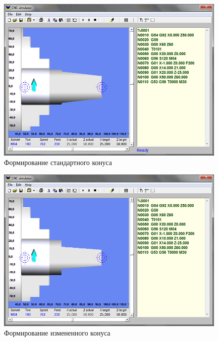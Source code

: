 \begin{figure}[ht]
\centering
	\includegraphics[scale=0.54]{1.png}
    \caption{Формирование стандартного конуса\label{fig:default}}
\end{figure}

\begin{figure}[ht]
\centering
    \includegraphics[scale=0.54]{2.png}
    \caption{Формирование измененного конуса\label{fig:changed}}
\end{figure}

\clearpage
